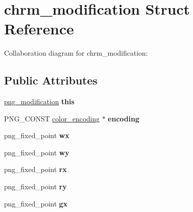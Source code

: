\hypertarget{structchrm__modification}{\section{chrm\+\_\+modification Struct Reference}
\label{structchrm__modification}
}


Collaboration diagram for chrm\+\_\+modification\+:
\subsection*{Public Attributes}
\begin{DoxyCompactItemize}
\item 
\hypertarget{structchrm__modification_a4e508e0331d5815749bba62a146b39e2}{\hyperlink{structpng__modification}{png\+\_\+modification} {\bfseries this}}\label{structchrm__modification_a4e508e0331d5815749bba62a146b39e2}

\item 
\hypertarget{structchrm__modification_ae0c27a82da4721d6bc04cb2b6f32202e}{P\+N\+G\+\_\+\+C\+O\+N\+S\+T \hyperlink{structcolor__encoding}{color\+\_\+encoding} $\ast$ {\bfseries encoding}}\label{structchrm__modification_ae0c27a82da4721d6bc04cb2b6f32202e}

\item 
\hypertarget{structchrm__modification_aa48c2002f8d4316a6bf8050abfe7bf75}{png\+\_\+fixed\+\_\+point {\bfseries wx}}\label{structchrm__modification_aa48c2002f8d4316a6bf8050abfe7bf75}

\item 
\hypertarget{structchrm__modification_aa43400a5b3ae67897608d22a6a658434}{png\+\_\+fixed\+\_\+point {\bfseries wy}}\label{structchrm__modification_aa43400a5b3ae67897608d22a6a658434}

\item 
\hypertarget{structchrm__modification_a1440ad97fa4f732c641ef33a3e19ece2}{png\+\_\+fixed\+\_\+point {\bfseries rx}}\label{structchrm__modification_a1440ad97fa4f732c641ef33a3e19ece2}

\item 
\hypertarget{structchrm__modification_adecf15f49c9dca207b09913ccbfcc601}{png\+\_\+fixed\+\_\+point {\bfseries ry}}\label{structchrm__modification_adecf15f49c9dca207b09913ccbfcc601}

\item 
\hypertarget{structchrm__modification_a28081f0991c250b7a8c39dedc0b94277}{png\+\_\+fixed\+\_\+point {\bfseries gx}}\label{structchrm__modification_a28081f0991c250b7a8c39dedc0b94277}


\end{DoxyCompactItemize}

